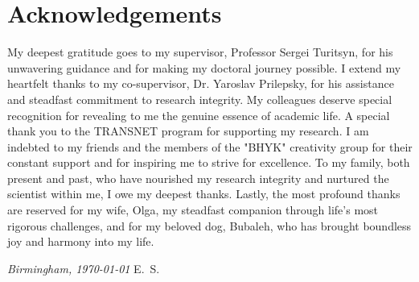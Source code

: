 \chapter*{Acknowledgements}

My deepest gratitude goes to my supervisor, Professor Sergei Turitsyn, for his unwavering guidance and for making my doctoral journey possible. I extend my heartfelt thanks to my co-supervisor, Dr. Yaroslav Prilepsky, for his assistance and steadfast commitment to research integrity. My colleagues deserve special recognition for revealing to me the genuine essence of academic life. A special thank you to the TRANSNET program for supporting my research. I am indebted to my friends and the members of the "BHYK" creativity group for their constant support and for inspiring me to strive for excellence.
To my family, both present and past, who have nourished my research integrity and nurtured the scientist within me, I owe my deepest thanks.
Lastly, the most profound thanks are reserved for my wife, Olga, my steadfast companion through life's most rigorous challenges, and for my beloved dog, Bubaleh, who has brought boundless joy and harmony into my life.

\bigskip
 
\noindent\textit{Birmingham, \today}
\hfill E.~S.
